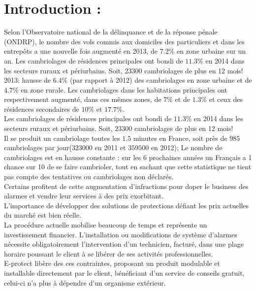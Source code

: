 \chapter{Introduction :}

Selon l’Observatoire national de la délinquance et de la réponse pénale (ONDRP), le nombre des vols commis aux domiciles des particuliers et dans les entrepôts a une nouvelle fois augmenté en 2013, de $7.2\%$ en zone urbaine sur un an. Les cambriolages de résidences principales ont bondi de $11.3\%$ en 2014 dans les secteurs ruraux et périurbains. Soit, 23300 cambriolages de plus en 12 mois!\\

2013: hausse de $6.4\%$ (par rapport à 2012) des cambriolages en zone urbaine et de $4.7\%$ en zone rurale. Les cambriolages dans les habitations principales ont respectivement augmenté, dans ces mêmes zones, de $7\%$ et de $1.3\%$ et ceux des résidences secondaires de $10\%$ et $17.7\%$.\\

Les cambriolages de résidences principales ont bondi de $11.3\%$ en 2014 dans les secteurs ruraux et périurbains. Soit, $23300$ cambriolages de plus en 12 mois!\\

Il se produit un cambriolage toutes les $1.5$ minutes en France, soit près de $985$ cambriolages par jour($323000$ en 2011 et $359500$ en 2012); Le nombre de cambriolages est en hausse constante : sur les 6 prochaines années un Français a 1 chance sur 10 de se faire cambrioler, tout en sachant que cette statistique ne tient pas compte des tentatives ou cambriolages non déclarés.\\

Certains profitent de cette augmentation d'infractions pour doper le business des alarmes et vendre leur services à des prix exorbitant.\\

L’importance de développer des solutions de protections défiant les prix actuelles du marché est bien réelle.\\

La procédure actuelle mobilise beaucoup de temps et représente un investissement financier. L’installation ou modifications de système d’alarmes nécessite obligatoirement l’intervention d’un technicien, facturé, dans une plage horaire poussant le client à se libérer de ses activités professionnelles.\\
E-protect libère des ces contraintes, proposant un produit modulable et installable directement par le client, bénéficiant d’un service de conseils gratuit, celui-ci n’a plus à dépendre d’un organisme extérieur.\cite{www:ondrp}\\
